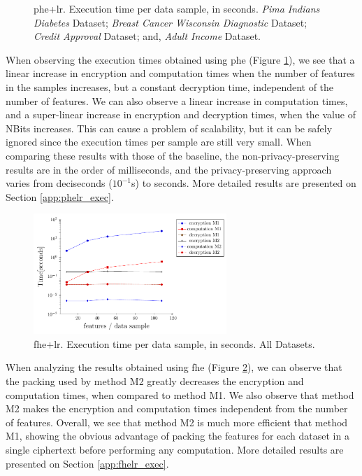 \begin{figure}[bh!]
\caption[\acs{phe}+\acs{lr}. Execution time per data sample, in seconds. All datasets.]{\acs{phe}+\acs{lr}. Execution time per data sample, in seconds.
 \emph{Pima Indians Diabetes} Dataset;
 \emph{Breast Cancer Wisconsin Diagnostic} Dataset;
 \emph{Credit Approval} Dataset; and,
 \emph{Adult Income} Dataset.}%
\label{fig:lr-phe}%
\end{figure}


When observing the execution times obtained using \ac{phe} (Figure \ref{fig:lr-phe}), we see that a linear increase in encryption and computation times when the number of features in the samples increases, but a constant decryption time, independent of the number of features.
We can also observe a linear increase in computation times, and a super-linear increase in encryption and decryption times, when the value of NBits increases. This can cause a problem of scalability, but it can be safely ignored since the execution times per sample are still very small.  When comparing these results with those of the baseline, the non-privacy-preserving results are in the order of milliseconds, and the privacy-preserving approach varies from deciseconds ($10^{-1}$s) to seconds. More detailed results are presented on Section \ref{app:phelr_exec}.

\begin{figure}[b!]
\centering
\includegraphics[width=0.65\textwidth]{images/graphs/lr_fhe.pdf}
\caption[\acs{fhe}+\acs{lr}. Execution time per data sample, in seconds. All datasets.]{\acs{fhe}+\acs{lr}. Execution time per data sample, in seconds. All Datasets.}
\label{fig:lr-fhe}
\end{figure}


When analyzing the results obtained using \ac{fhe} (Figure \ref{fig:lr-fhe}), we can observe that the packing used by method M2 greatly decreases the encryption and computation times, when compared to method M1. We also observe that method M2 makes the encryption and computation times independent from the number of features.
Overall, we see that method M2 is much more efficient that method M1, showing the obvious advantage of packing the features for each dataset in a single ciphertext before performing any computation. More detailed results are presented on Section \ref{app:fhelr_exec}.

